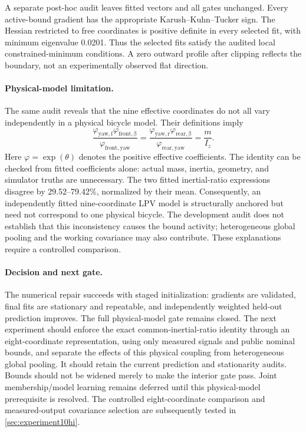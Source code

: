 A separate post-hoc audit leaves fitted vectors and all gates unchanged.
Every active-bound gradient has the appropriate Karush--Kuhn--Tucker sign.
The Hessian restricted to free coordinates is positive definite in every
selected fit, with minimum eigenvalue 0.0201. Thus the selected fits satisfy
the audited local constrained-minimum conditions. A zero outward profile
after clipping reflects the boundary, not an experimentally observed flat
direction.

\paragraph{Physical-model limitation.}
The same audit reveals that the nine effective coordinates do not all vary
independently in a physical bicycle model. Their definitions imply
\begin{equation}
 \frac{\varphi_{\mathrm{yaw,f}}\varphi_{\mathrm{front,\beta}}}
      {\varphi_{\mathrm{front,yaw}}}
 =
 \frac{\varphi_{\mathrm{yaw,r}}\varphi_{\mathrm{rear,\beta}}}
      {\varphi_{\mathrm{rear,yaw}}}
 =\frac{m}{I_z}.
 \label{eq:10hh-physical-coupling}
\end{equation}
Here $\varphi=\exp(\theta)$ denotes the positive effective coefficients.
The identity can be checked from fitted coefficients alone: actual mass,
inertia, geometry, and simulator truths are unnecessary. The two fitted
inertial-ratio expressions disagree by 29.52--79.42\%, normalized by their
mean. Consequently, an independently fitted nine-coordinate LPV model is
structurally anchored but need not correspond to one physical bicycle.
The development audit does not establish that this inconsistency causes the
bound activity; heterogeneous global pooling and the working covariance may
also contribute. These explanations require a controlled comparison.

\paragraph{Decision and next gate.}
The numerical repair succeeds with staged initialization: gradients are
validated, final fits are stationary and repeatable, and independently
weighted held-out prediction improves. The full physical-model gate remains
closed. The next experiment should enforce the exact common-inertial-ratio
identity through an eight-coordinate representation, using only measured
signals and public nominal bounds, and separate the effects of this physical
coupling from heterogeneous global pooling. It should retain the current
prediction and stationarity audits. Bounds should not be widened merely to
make the interior gate pass. Joint membership/model learning remains deferred
until this physical-model prerequisite is resolved.
The controlled eight-coordinate comparison and measured-output covariance
selection are subsequently tested in \cref{sec:experiment10hi}.

